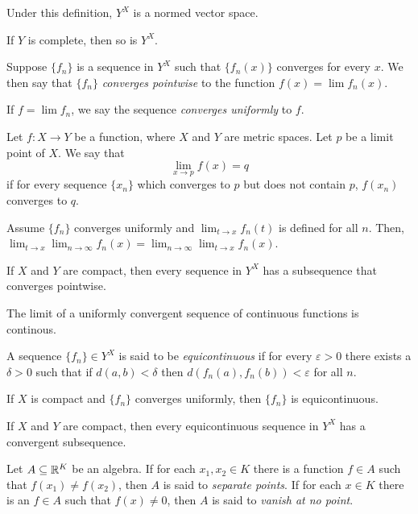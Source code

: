 \begin{prop}
    Under this definition, $Y^X$ is a normed vector space.
\end{prop}
\begin{prop}
    If $Y$ is complete, then so is $Y^X$.
\end{prop}
\begin{defn}
    Suppose $\{f_n\}$ is a sequence in $Y^X$ such that $\{f_n(x)\}$
    converges for every $x$. We then say that $\{f_n\}$ \emph{converges
    pointwise} to the function $f(x)=\lim f_n(x)$.

    If $f=\lim f_n$, we say the sequence \emph{converges uniformly} to $f$.
\end{defn}
\begin{defn}
  Let $f:X\to Y$ be a function, where $X$ and $Y$ are metric spaces.
  Let $p$ be a limit point of $X$. We say that
  \[\lim_{x\to p}f(x)=q\] if for every sequence $\{x_n\}$ which converges
  to $p$ but does not contain $p$, $f(x_n)$ converges to $q$.
\end{defn}
\begin{prop}
    Assume $\{f_n\}$ converges uniformly and $\lim_{t\to x}f_n(t)$ is defined for
    all $n$. Then, $\lim_{t\to x}\lim_{n\to\infty}
    f_n(x)=\lim_{n\to\infty}\lim_{t\to x}f_n(x)$.
\end{prop}
\begin{prop}
    If $X$ and $Y$ are compact, then every sequence in $Y^X$ has a subsequence
    that converges pointwise.
\end{prop}
\begin{cor}
    The limit of a uniformly convergent sequence of continuous functions is
    continous.
\end{cor}
\begin{defn}
    A sequence $\{f_n\}\in Y^X$ is said to be \emph{equicontinuous} if for
    every $\varepsilon>0$ there exists a $\delta>0$ such that if $d(a,b)<\delta$
    then $d(f_n(a),f_n(b))<\varepsilon$ for all $n$.
\end{defn}
\begin{prop}
    If $X$ is compact and $\{f_n\}$ converges uniformly, then $\{f_n\}$ is
    equicontinuous.
\end{prop}
\begin{prop}
    If $X$ and $Y$ are compact, then every equicontinuous sequence in
    $Y^X$ has a convergent subsequence.
\end{prop}
\begin{defn}
    Let $A\subseteq \mathbb{R}^K$ be an algebra. If for
    each $x_1,x_2\in K$ there is a function $f\in A$ such that $f(x_1)\ne
    f(x_2)$, then $A$ is said to \emph{separate points}. If for each $x\in
    K$ there is an $f\in A$ such that $f(x)\ne 0$, then $A$ is said to
    \emph{vanish at no point}.
\end{defn}
